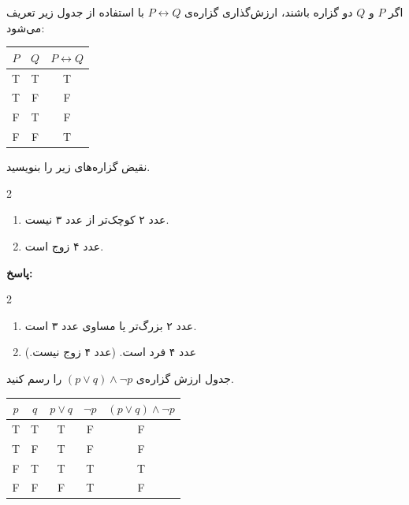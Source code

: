 اگر $P$ و $Q$ دو گزاره باشند، ارزش‌گذاری گزاره‌ی
$P \leftrightarrow Q$
با استفاده از جدول زیر تعریف می‌شود:
\vspace{-0.1cm}
\begin{table}[H]
	\centering
	\begin{latin}
		\begin{tabular}{c|c|c}
			$P$ & $Q$ & $P \leftrightarrow Q$ \\
			\hline
			T & T & T \\
			T & F & F \\
			F & T & F \\
			F & F & T
		\end{tabular}
	\end{latin}
\end{table}

\begin{example}
	نقیض گزاره‌های زیر را بنویسید.
	\vspace{-0.5cm}
	\begin{multicols}{2}
		\begin{enumerate}
			\item 
			عدد ۲ کوچک‌تر از عدد ۳ نیست.
			\item 
			عدد ۴ زوج است.
		\end{enumerate}
	\end{multicols}
	\noindent \textbf{پاسخ:}
	\vspace{-0.5cm}
	\begin{multicols}{2}
		\begin{enumerate}
			\item 
			عدد ۲ بزرگ‌تر یا مساوی عدد ۳ است.
			\item 
			عدد ۴ فرد است. (عدد ۴ زوج نیست.)
		\end{enumerate}
	\end{multicols}
	\vspace{0.001cm}
\end{example}

\begin{example}
	جدول ارزش گزاره‌ی
	$(p \vee q) \wedge \neg p$
	را رسم کنید.
	\begin{table}[H]
		\centering
		\begin{latin}
			\begin{tabular}{c|c|c|c|c}
				$p$ & $q$ & $p \vee q$ & $\neg p$ & $(p \vee q) \wedge \neg p$ \\
				\hline
				T & T & T & F & F \\
				T & F & T & F & F \\
				F & T & T & T & T \\
				F & F & F & T & F
			\end{tabular}
		\end{latin}
	\end{table}
\end{example}


